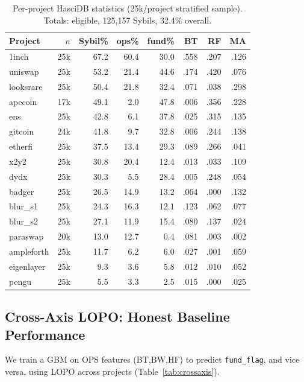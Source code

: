 \documentclass[sigconf,nonacm=false]{acmart}
\begin{document}
\begin{table}[t]
\caption{Per-project HasciDB statistics (25k/project stratified sample). Totals: \largeScaleNAddresses{} eligible, 125,157 Sybils, 32.4\% overall.}
\label{tab:baseline}
\small
\begin{tabular}{lrrrrrrr}
\toprule
Project & $n$ & Sybil\% & ops\% & fund\% & BT & RF & MA \\
\midrule
1inch       & 25k & 67.2 & 60.4 & 30.0 & .558 & .207 & .126 \\
uniswap     & 25k & 53.2 & 21.4 & 44.6 & .174 & .420 & .076 \\
looksrare   & 25k & 50.4 & 21.8 & 32.4 & .071 & .038 & .298 \\
apecoin     & 17k & 49.1 & 2.0  & 47.8 & .006 & .356 & .228 \\
ens         & 25k & 42.8 & 6.1  & 37.8 & .025 & .315 & .135 \\
gitcoin     & 24k & 41.8 & 9.7  & 32.8 & .006 & .244 & .138 \\
etherfi     & 25k & 37.5 & 13.4 & 29.3 & .089 & .266 & .041 \\
x2y2        & 25k & 30.8 & 20.4 & 12.4 & .013 & .033 & .109 \\
dydx        & 25k & 30.3 & 5.5  & 28.4 & .005 & .248 & .054 \\
badger      & 25k & 26.5 & 14.9 & 13.2 & .064 & .000 & .132 \\
blur\_s1    & 25k & 24.3 & 16.3 & 12.1 & .123 & .062 & .077 \\
blur\_s2    & 25k & 27.1 & 11.9 & 15.4 & .080 & .137 & .024 \\
paraswap    & 20k & 13.0 & 12.7 & 0.4  & .081 & .003 & .002 \\
ampleforth  & 25k & 11.7 & 6.2  & 6.0  & .027 & .001 & .059 \\
eigenlayer  & 25k & 9.3  & 3.6  & 5.8  & .012 & .010 & .052 \\
pengu       & 25k & 5.5  & 3.3  & 2.5  & .015 & .000 & .025 \\
\bottomrule
\end{tabular}
\end{table}

\subsection{Cross-Axis LOPO: Honest Baseline Performance}
\label{sec:crossaxis}

We train a GBM on OPS features (BT,BW,HF) to predict \texttt{fund\_flag}, and vice versa, using LOPO across \largeScaleNProjects{} projects (Table~\ref{tab:crossaxis}).
\end{document}
